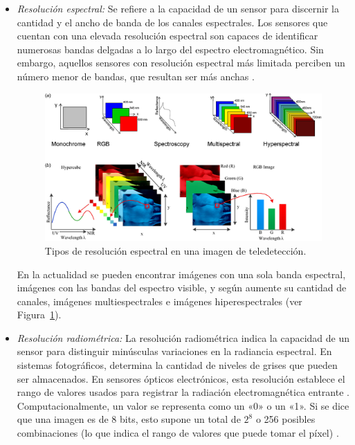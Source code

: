 \begin{itemize}
    \item \textit{Resolución espectral:} Se refiere a la capacidad de un sensor para discernir la cantidad y el ancho de banda de los canales espectrales. Los sensores que cuentan con una elevada resolución espectral son capaces de identificar numerosas bandas delgadas a lo largo del espectro electromagnético. Sin embargo, aquellos sensores con resolución espectral más limitada perciben un número menor de bandas, que resultan ser más anchas \cite{chuvieco2016fundamentals}.

          \begin{figure}[H]
              \begin{center}
                  \includegraphics[width=1\textwidth]{Images/ResolucionEspectral.png}
              \end{center}
              \caption{Tipos de resolución espectral en una imagen de teledetección.}
              \label{fig:ResolucionEspectral}
          \end{figure}

          En la actualidad se pueden encontrar imágenes con una sola banda espectral, imágenes con las bandas del espectro visible, y según aumente su cantidad de canales, imágenes multiespectrales e imágenes hiperespectrales (ver Figura~\ref{fig:ResolucionEspectral}).

    \item \textit{Resolución radiométrica:} La resolución radiométrica indica la capacidad de un sensor para distinguir minúsculas variaciones en la radiancia espectral. En sistemas fotográficos, determina la cantidad de niveles de grises que pueden ser almacenados. En sensores ópticos electrónicos, esta resolución establece el rango de valores usados para registrar la radiación electromagnética entrante \cite{chuvieco2016fundamentals}. Computacionalmente, un valor se representa como un «0» o un «1». Si se dice que una imagen es de 8 bits, esto supone un total de \(2^8\) o 256 posibles combinaciones (lo que indica el rango de valores que puede tomar el píxel) \cite{tempfli2009principles}.


\end{itemize}
